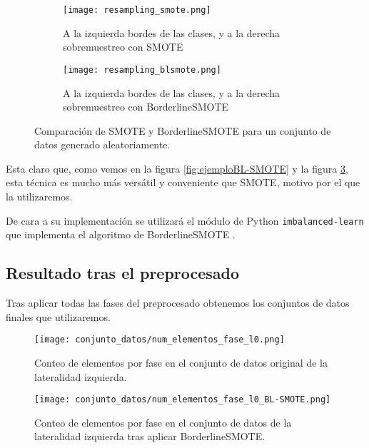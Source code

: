\begin{figure}[H]
    \centering
	 \begin{subfigure}[b]{\textwidth}
		 \centering
		 \texttt{[image: resampling\_smote.png]}
		 \caption{A la izquierda bordes de las clases, y a la derecha sobremuestreo con SMOTE}
		 \label{fig:SMOTE-cmp}
	 \end{subfigure}

    \begin{subfigure}[b]{\textwidth}
		 \centering
		  \texttt{[image: resampling\_blsmote.png]}
        \caption{A la izquierda bordes de las clases, y a la derecha sobremuestreo con BorderlineSMOTE}
        \label{fig:BLSMOTE-cmp}
    \end{subfigure}

    \caption{Comparación de SMOTE y BorderlineSMOTE para un conjunto de datos generado aleatoriamente.}\label{fig:BLSMOTE-SMOTE}

\end{figure}

Esta claro que, como vemos en la figura \ref{fig:ejemploBL-SMOTE} y la figura \ref{fig:BLSMOTE-SMOTE}, esta técnica es mucho más versátil y conveniente que SMOTE, motivo por el que la utilizaremos.


De cara a su implementación se utilizará el módulo de Python \texttt{imbalanced-learn} que implementa el algoritmo de BorderlineSMOTE \cite{imblearnBLSMOTE}.



\newpage

\subsection{Resultado tras el preprocesado}

Tras aplicar todas las fases del preprocesado obtenemos los conjuntos de datos finales que utilizaremos.

\begin{figure}[H]
    \centering
	  \texttt{[image: conjunto\_datos/num\_elementos\_fase\_l0.png]}
    \caption{Conteo de elementos por fase en el conjunto de datos original de la lateralidad izquierda.}
	 \label{fig:l0-orig}
\end{figure}

\begin{figure}[H]
    \centering
     \texttt{[image: conjunto\_datos/num\_elementos\_fase\_l0\_BL-SMOTE.png]}
    \caption{Conteo de elementos por fase en el conjunto de datos de la lateralidad izquierda tras aplicar BorderlineSMOTE.}
	 \label{fig:l0-over}
\end{figure}

